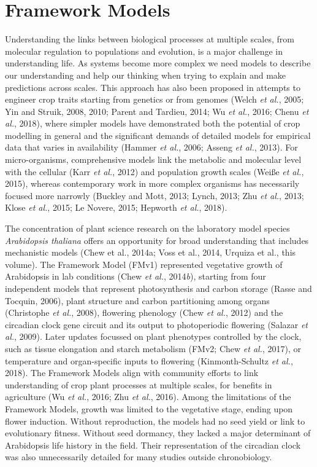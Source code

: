 \documentclass[phd]{infthesis}
\begin{document}
\chapter{Framework Models}
Understanding the links between biological processes at multiple scales,
from molecular regulation to populations and evolution, is a major
challenge in understanding life. As systems become more complex we need
models to describe our understanding and help our thinking when trying
to explain and make predictions across scales. This approach has also
been proposed in attempts to engineer crop traits starting from genetics
or from genomes (Welch \emph{et al.}, 2005; Yin and Struik, 2008, 2010;
Parent and Tardieu, 2014; Wu \emph{et al.}, 2016; Chenu \emph{et al.},
2018), where simpler models have demonstrated both the potential of crop
modelling in general and the significant demands of detailed models for
empirical data that varies in availability (Hammer \emph{et al.}, 2006;
Asseng \emph{et al.}, 2013). For micro-organisms, comprehensive models
link the metabolic and molecular level with the cellular (Karr \emph{et
al.}, 2012) and population growth scales (Weiße \emph{et al.}, 2015),
whereas contemporary work in more complex organisms has necessarily
focused more narrowly (Buckley and Mott, 2013; Lynch, 2013; Zhu \emph{et
al.}, 2013; Klose \emph{et al.}, 2015; Le Novere, 2015; Hepworth
\emph{et al.}, 2018).

The concentration of plant science research on the laboratory model
species \emph{Arabidopsis thaliana} offers an opportunity for broad
understanding that includes mechanistic models (Chew et al., 2014a; Voss
et al., 2014, Urquiza et al., this volume). The Framework Model (FMv1)
represented vegetative growth of Arabidopsis in lab conditions (Chew
\emph{et al.}, 2014\emph{b}), starting from four independent models that
represent photosynthesis and carbon storage (Rasse and Tocquin, 2006),
plant structure and carbon partitioning among organs (Christophe
\emph{et al.}, 2008), flowering phenology (Chew \emph{et al.}, 2012) and
the circadian clock gene circuit and its output to photoperiodic
flowering (Salazar \emph{et al.}, 2009). Later updates focussed on plant
phenotypes controlled by the clock, such as tissue elongation and starch
metabolism (FMv2; Chew \emph{et al.}, 2017), or temperature and
organ-specific inputs to flowering (Kinmonth-Schultz \emph{et al.},
2018). The Framework Models align with community efforts to link
understanding of crop plant processes at multiple scales, for benefits
in agriculture (Wu \emph{et al.}, 2016; Zhu \emph{et al.}, 2016). Among
the limitations of the Framework Models, growth was limited to the
vegetative stage, ending upon flower induction. Without reproduction,
the models had no seed yield or link to evolutionary fitness. Without
seed dormancy, they lacked a major determinant of Arabidopsis life
history in the field. Their representation of the circadian clock was
also unnecessarily detailed for many studies outside chronobiology.
\end{document}
